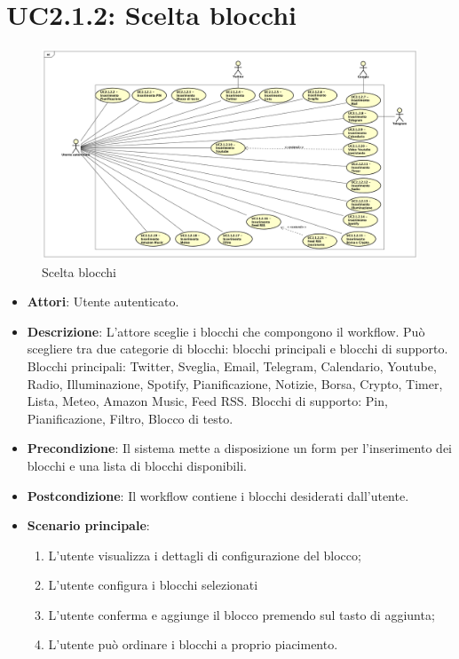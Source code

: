 \section{UC2.1.2: Scelta blocchi}
\label{UC2.1.2}
\begin{figure}[h]
\centering
\includegraphics[scale=0.2]{Diagram/UC2-1-2.png}
\caption{Scelta blocchi}\label{}
\end{figure}
\begin{itemize}
	\item \textbf{Attori}: Utente autenticato.
	\item \textbf{Descrizione}: L'attore sceglie i blocchi che compongono il workflow. Può scegliere tra due categorie di blocchi: blocchi principali e blocchi di supporto.
	Blocchi principali: Twitter, Sveglia, Email, Telegram, Calendario, Youtube, Radio, Illuminazione, Spotify, Pianificazione, Notizie, Borsa, Crypto, Timer, Lista, Meteo, Amazon Music, Feed RSS.
	Blocchi di supporto: Pin, Pianificazione, Filtro, Blocco di testo.
	\item \textbf{Precondizione}: Il sistema mette a disposizione un form per l'inserimento dei blocchi e una lista di blocchi disponibili.
	\item \textbf{Postcondizione}: Il workflow contiene i blocchi desiderati dall'utente.
	\item \textbf{Scenario principale}:
	\begin{enumerate} \item L'utente visualizza i dettagli di configurazione del blocco;  \item L'utente configura i blocchi selezionati \item L'utente conferma e aggiunge il blocco premendo sul tasto di aggiunta; \item L'utente può ordinare i blocchi a proprio piacimento. \end{enumerate}
\end{itemize}

